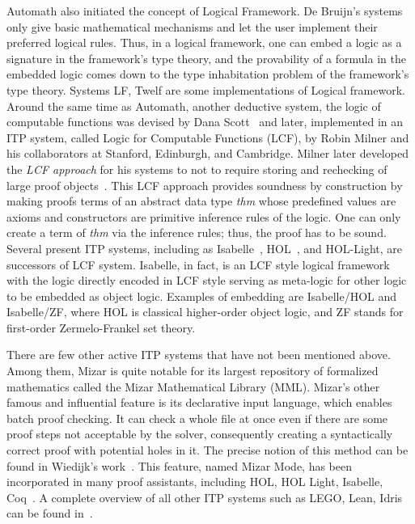 Automath also initiated the concept of Logical Framework. De Bruijn's systems only give basic mathematical mechanisms and let the user implement their preferred logical rules. Thus, in a logical framework, one can embed a logic as a signature in the framework's type theory, and the provability of a formula in the embedded logic comes down to the type inhabitation problem of the framework's type theory. Systems LF, Twelf are some implementations of Logical framework. Around the same time as Automath, another deductive system, the logic of computable functions was devised by Dana Scott~\cite{Scott_1993} and later, implemented in an ITP system, called Logic for Computable Functions (LCF), by Robin Milner and his collaborators at Stanford, Edinburgh, and Cambridge. Milner later developed the \emph{LCF approach} for his systems to not to require storing and rechecking of large proof objects~\cite{Geuvers_2009}. This LCF approach provides soundness by construction by making proofs terms of an abstract data type \emph{thm} whose predefined values are axioms and constructors are primitive inference rules of the logic. One can only create a term of \emph{thm} via the inference rules; thus, the proof has to be sound. Several present ITP systems, including as Isabelle~\cite{Wenzel_2008}, HOL~\cite{Gordon_Melham_1993}, and HOL-Light, are successors of LCF system. Isabelle, in fact, is an LCF style logical framework with the logic directly encoded in LCF style serving as meta-logic for other logic to be embedded as object logic. Examples of embedding are Isabelle/HOL and Isabelle/ZF, where HOL is classical higher-order object logic, and ZF stands for first-order Zermelo-Frankel set theory. 

There are few other active ITP systems that have not been mentioned above. Among them, Mizar is quite notable for its largest repository of formalized mathematics called the Mizar Mathematical Library (MML). Mizar's other famous and influential feature is its declarative input language, which enables batch proof checking. It can check a whole file at once even if there are some proof steps not acceptable by the solver, consequently creating a syntactically correct proof with potential holes in it. The precise notion of this method can be found in Wiedijk's work~\cite{Wiedijk_2003_b}. This feature, named Mizar Mode, has been incorporated in many proof assistants, including HOL, HOL Light, Isabelle, Coq~\cite{Geuvers_2009, ringer_et_al_2019_b}. A complete overview of all other ITP systems such as LEGO, Lean, Idris can be found in~\cite{Wiedijk_2003_a, Harrison_2014, Geuvers_2009}.

